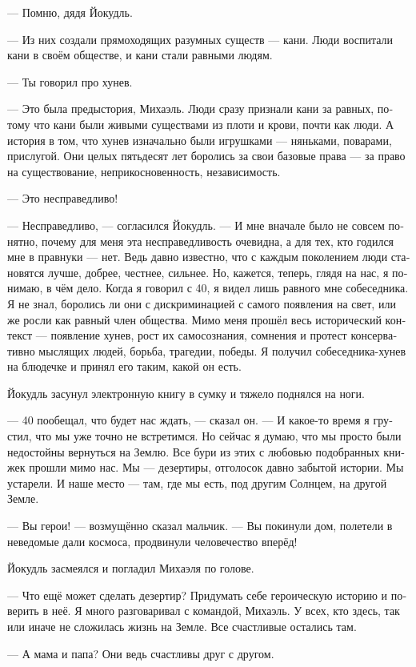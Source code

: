 \documentclass[a4paper,10pt,fleqn]{book}\usepackage{polyglossia}\setdefaultlanguage[babelshorthands=true]{russian}\setotherlanguage{english}\defaultfontfeatures{Ligatures=TeX,Mapping=tex-text}\usepackage{xcolor}\newcommand{\ml}[3]{#2}
\begin{document}
--- Помню, дядя Йокудль.

--- Из них создали прямоходящих разумных существ --- кани.
Люди воспитали кани в своём обществе, и кани стали равными людям.

--- Ты говорил про хунев.

--- Это была предыстория, Михаэль.
Люди сразу признали кани за равных, потому что кани были живыми существами из плоти и крови, почти как люди.
А история в том, что хунев изначально были игрушками --- няньками, поварами, прислугой.
Они целых пятьдесят лет боролись за свои базовые права --- за право на существование, неприкосновенность, независимость.

--- Это несправедливо!

--- Несправедливо, --- согласился Йокудль.
--- И мне вначале было не совсем понятно, почему для меня эта несправедливость очевидна, а для тех, кто годился мне в правнуки --- нет.
Ведь давно известно, что с каждым поколением люди становятся лучше, добрее, честнее, сильнее.
Но, кажется, теперь, глядя на нас, я понимаю, в чём дело.
Когда я говорил с 40, я видел лишь равного мне собеседника.
Я не знал, боролись ли они с дискриминацией с самого появления на свет, или же росли как равный член общества.
Мимо меня прошёл весь исторический контекст --- появление хунев, рост их самосознания, сомнения и протест консервативно мыслящих людей, борьба, трагедии, победы.
Я получил собеседника-хунев на блюдечке и принял его таким, какой он есть.

Йокудль засунул электронную книгу в сумку и тяжело поднялся на ноги.

--- 40 пообещал, что будет нас ждать, --- сказал он.
--- И какое-то время я грустил, что мы уже точно не встретимся.
Но сейчас я думаю, что мы просто были недостойны вернуться на Землю.
Все бури из этих с любовью подобранных книжек прошли мимо нас.
Мы --- дезертиры, отголосок давно забытой истории.
Мы устарели.
И наше место --- там, где мы есть, под другим Солнцем, на другой Земле.

--- Вы герои! --- возмущённо сказал мальчик.
--- Вы покинули дом, полетели в неведомые дали космоса, продвинули человечество вперёд!

Йокудль засмеялся и погладил Михаэля по голове.

--- Что ещё может сделать дезертир?
Придумать себе героическую историю и поверить в неё.
Я много разговаривал с командой, Михаэль.
У всех, кто здесь, так или иначе не сложилась жизнь на Земле.
Все счастливые остались там.

--- А мама и папа?
Они ведь счастливы друг с другом.
\end{document}
